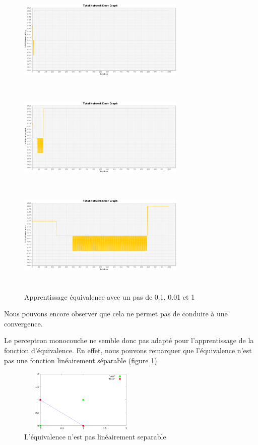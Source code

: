 \documentclass[twoside,openright,a4paper,11pt,french]{article}
\begin{document}
\begin{figure}[ht]
\centering
\includegraphics[width=8cm,height=5cm]{./pics/eq/mono_eq_0.1.eps}
\includegraphics[width=8cm,height=5cm]{./pics/eq/mono_eq_0.01.eps}
\includegraphics[width=8cm,height=5cm]{./pics/eq/mono_eq_0.001.eps}
\caption{Apprentissage équivalence avec un pas de 0.1, 0.01 et 1}
\end{figure}

Nous pouvons encore observer que cela ne permet pas de conduire à une convergence.

Le perceptron monocouche ne semble donc pas adapté pour l'apprentissage de la fonction
d'équivalence. En effet, nous pouvons remarquer que l'équivalence n'est pas une fonction
linéairement séparable (figure \ref{fig:eqnlin}).

\begin{figure}[ht]
\centering
\includegraphics[width=6cm,height=3cm]{./pics/eqnonlin/eqlinsep.eps}
\caption{L'équivalence n'est pas linéairement separable}
\label{fig:eqnlin}
\end{figure}
\end{document}
